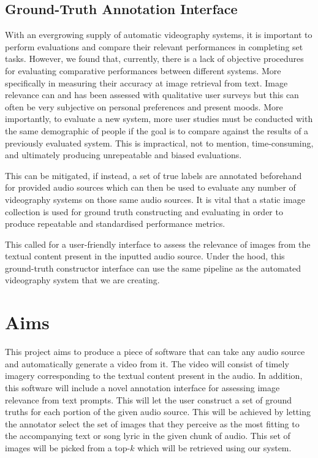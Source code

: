 \documentclass{l4proj}
\begin{document}
\subsection{Ground-Truth Annotation Interface}
With an evergrowing supply of automatic videography systems, it is important to perform evaluations and compare their relevant performances in completing set tasks. However, we found that, currently, there is a lack of objective procedures for evaluating comparative performances between different systems. More specifically in measuring their accuracy at image retrieval from text. Image relevance can and has been assessed with qualitative user surveys but this can often be very subjective on personal preferences and present moods. More importantly, to evaluate a new system, more user studies must be conducted with the same demographic of people if the goal is to compare against the results of a previously evaluated system. This is impractical, not to mention, time-consuming, and ultimately producing unrepeatable and biased evaluations.

This can be mitigated, if instead, a set of true labels are annotated beforehand for provided audio sources which can then be used to evaluate any number of videography systems on those same audio sources. It is vital that a static image collection is used for ground truth constructing and evaluating in order to produce repeatable and standardised performance metrics.

This called for a user-friendly interface to assess the relevance of images from the textual content present in the inputted audio source. Under the hood, this ground-truth constructor interface can use the same pipeline as the automated videography system that we are creating. 


\section{Aims}
This project aims to produce a piece of software that can take any audio source and automatically generate a video from it. The video will consist of timely imagery corresponding to the textual content present in the audio. In addition, this software will include a novel annotation interface for assessing image relevance from text prompts. This will let the user construct a set of ground truths for each portion of the given audio source. This will be achieved by letting the annotator select the set of images that they perceive as the most fitting to the accompanying text or song lyric in the given chunk of audio. This set of images will be picked from a top-$k$ which will be retrieved using our system.
\end{document}
